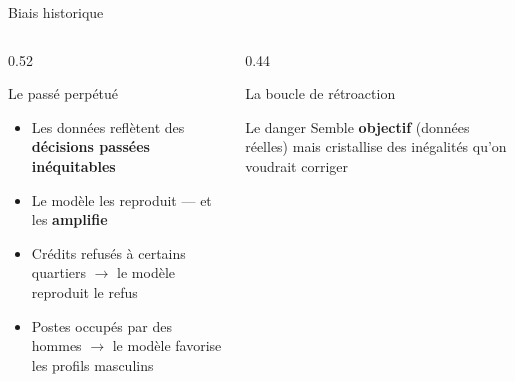 \documentclass[aspectratio=169, 10pt]{beamer}
\begin{document}
\begin{frame}{Biais historique}
  \begin{columns}[T]
    \begin{column}{0.52\textwidth}
      \begin{alertblock}{Le passé perpétué}
        \begin{itemize}
          \item Les données reflètent des \textbf{décisions passées inéquitables}
          \item Le modèle les reproduit — et les \textbf{amplifie}
        \end{itemize}
      \end{alertblock}
      \begin{itemize}
        \item Crédits refusés à certains quartiers $\to$ le modèle reproduit le refus
        \item Postes occupés par des hommes $\to$ le modèle favorise les profils masculins
      \end{itemize}
    \end{column}
    \begin{column}{0.44\textwidth}
      \begin{block}{La boucle de rétroaction}
        \begin{center}
        \end{center}
      \end{block}
      \begin{exampleblock}{Le danger}
        Semble \textbf{objectif} (données réelles) mais cristallise des
        inégalités qu'on voudrait corriger
      \end{exampleblock}
    \end{column}
  \end{columns}
\end{frame}
\end{document}
